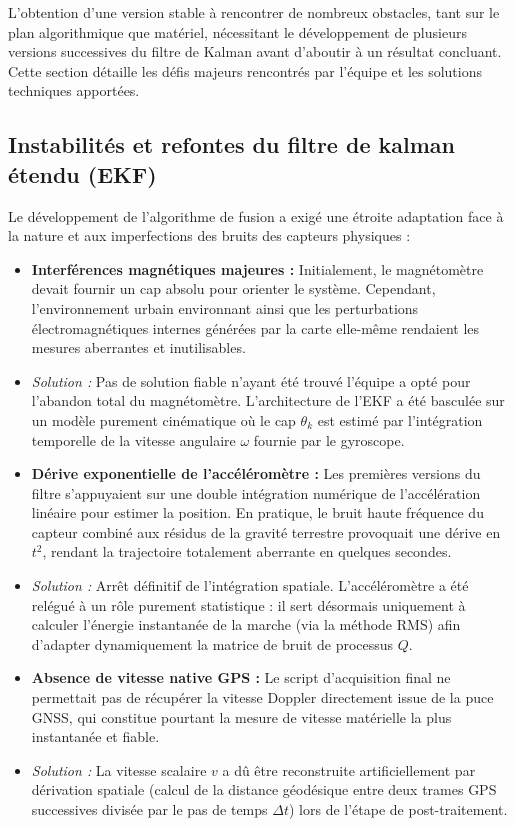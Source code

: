 L'obtention d'une version stable à rencontrer de nombreux obstacles, tant sur le plan algorithmique que matériel, nécessitant le développement de plusieurs versions successives du filtre de Kalman avant d'aboutir à un résultat concluant. Cette section détaille les défis majeurs rencontrés par l'équipe et les solutions techniques apportées.

\subsection{Instabilités et refontes du filtre de kalman étendu (EKF)}
Le développement de l'algorithme de fusion a exigé une étroite adaptation face à la nature et aux imperfections des bruits des capteurs physiques :

\begin{itemize}
    \item \textbf{Interférences magnétiques majeures :} Initialement, le magnétomètre devait fournir un cap absolu pour orienter le système. Cependant, l'environnement urbain environnant ainsi que les perturbations électromagnétiques internes générées par la carte elle-même rendaient les mesures aberrantes et inutilisables.
    \item \textit{Solution :} Pas de solution fiable n'ayant été trouvé l'équipe a opté pour l'abandon total du magnétomètre. L'architecture de l'EKF a été basculée sur un modèle purement cinématique où le cap $\theta_k$ est estimé par l'intégration temporelle de la vitesse angulaire $\omega$ fournie par le gyroscope.
    
    \item \textbf{Dérive exponentielle de l'accéléromètre :} Les premières versions du filtre s'appuyaient sur une double intégration numérique de l'accélération linéaire pour estimer la position. En pratique, le bruit haute fréquence du capteur combiné aux résidus de la gravité terrestre provoquait une dérive en $t^2$, rendant la trajectoire totalement aberrante en quelques secondes.
    \item \textit{Solution :} Arrêt définitif de l'intégration spatiale. L'accéléromètre a été relégué à un rôle purement statistique : il sert désormais uniquement à calculer l'énergie instantanée de la marche (via la méthode RMS) afin d'adapter dynamiquement la matrice de bruit de processus $Q$.
    
    \item \textbf{Absence de vitesse native GPS :} Le script d'acquisition final ne permettait pas de récupérer la vitesse Doppler directement issue de la puce GNSS, qui constitue pourtant la mesure de vitesse matérielle la plus instantanée et fiable.
    \item \textit{Solution :} La vitesse scalaire $v$ a dû être reconstruite artificiellement par dérivation spatiale (calcul de la distance géodésique entre deux trames GPS successives divisée par le pas de temps $\Delta t$) lors de l'étape de post-traitement.
    

\end{itemize}
